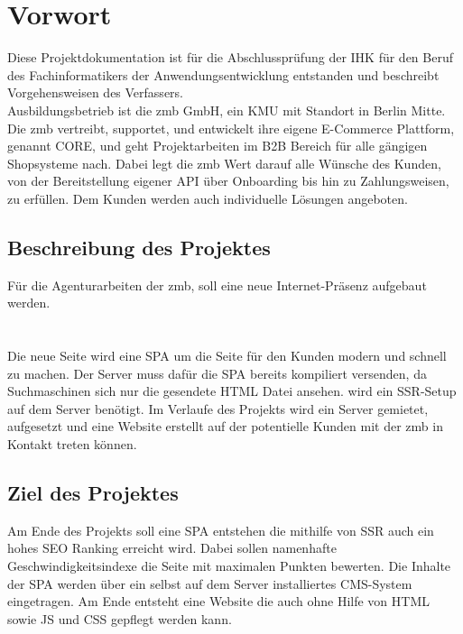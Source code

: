 \documentclass[11pt,a4paper]{article}
\begin{document}
\section{Vorwort}
Diese Projektdokumentation ist für die Abschlussprüfung der IHK für den Beruf des Fachinformatikers der Anwendungsentwicklung entstanden und beschreibt Vorgehensweisen des Verfassers.\\
Ausbildungsbetrieb ist die zmb GmbH, ein \acs{KMU} mit Standort in Berlin Mitte.
Die zmb vertreibt, supportet, und entwickelt ihre eigene E-Commerce Plattform, genannt CORE, und geht Projektarbeiten im \acs{B2B} Bereich für alle gängigen Shopsysteme nach.
Dabei legt die zmb Wert darauf alle Wünsche des Kunden, von der Bereitstellung eigener API über Onboarding bis hin zu Zahlungsweisen, zu erfüllen. Dem Kunden werden auch individuelle Lösungen angeboten.
\subsection{Beschreibung des Projektes}
Für die Agenturarbeiten der zmb, soll eine neue Internet-Präsenz aufgebaut werden.\\\\\\
Die neue Seite wird eine \acs{SPA} um die Seite für den Kunden modern und schnell zu machen.
Der Server muss dafür die \acs{SPA} bereits kompiliert versenden, da Suchmaschinen sich nur die gesendete HTML Datei ansehen. wird ein \acs{SSR}-Setup auf dem Server benötigt.
Im Verlaufe des Projekts wird ein Server gemietet, aufgesetzt und eine Website erstellt auf der potentielle Kunden mit der zmb in Kontakt treten können.
\subsection{Ziel des Projektes}
Am Ende des Projekts soll eine \acs{SPA} entstehen die mithilfe von \acs{SSR} auch ein hohes SEO Ranking erreicht wird. Dabei sollen namenhafte Geschwindigkeitsindexe die Seite mit maximalen Punkten bewerten.
Die Inhalte der \acs{SPA} werden über ein selbst auf dem Server installiertes CMS-System eingetragen.
Am Ende entsteht eine Website die auch ohne Hilfe von HTML sowie JS und CSS gepflegt werden kann.
\end{document}
